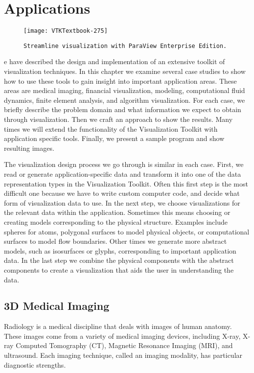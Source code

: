 \chapter{Applications}
\label{chap:applications}

\begin{figure}[ht]
	\hfill
	\begin{minipage}{0.5\textwidth}
		\centering
		\texttt{[image: VTKTextbook-275]}
		\caption*{\texttt{Streamline visualization with ParaView Enterprise Edition.}}
	\end{minipage}
\end{figure}


e have described the design and implementation of an extensive toolkit of visualization techniques.
In this chapter we examine several case studies to show how to use these tools to gain insight into important application areas.
These areas are medical imaging, financial visualization, modeling, computational fluid dynamics, finite element analysis, and algorithm visualization. For each case, we briefly describe the problem domain and what information we expect to obtain through visualization.
Then we craft an approach to show the results.
Many times we will extend the functionality of the Visualization Toolkit with application specific tools.
Finally, we present a sample program and show resulting images.

The visualization design process we go through is similar in each case.
First, we read or generate application-specific data and transform it into one of the data representation types in the Visualization Toolkit.
Often this first step is the most difficult one because we have to write custom computer code, and decide what form of visualization data to use.
In the next step, we choose visualizations for the relevant data within the application.
Sometimes this means choosing or creating models corresponding to the physical structure. Examples include spheres for atoms, polygonal surfaces to model physical objects, or computational surfaces to model flow boundaries.
Other times we generate more abstract models, such as isosurfaces or glyphs, corresponding to important application data.
In the last step we combine the physical components with the abstract components to create a visualization that aids the user in understanding the data.

\section{3D Medical Imaging}
Radiology is a medical discipline that deals with images of human anatomy.
These images come from a variety of medical imaging devices, including X-ray, X-ray Computed Tomography (CT), Magnetic Resonance Imaging (MRI), and ultrasound. Each imaging technique, called an imaging modality, has particular diagnostic strengths.

